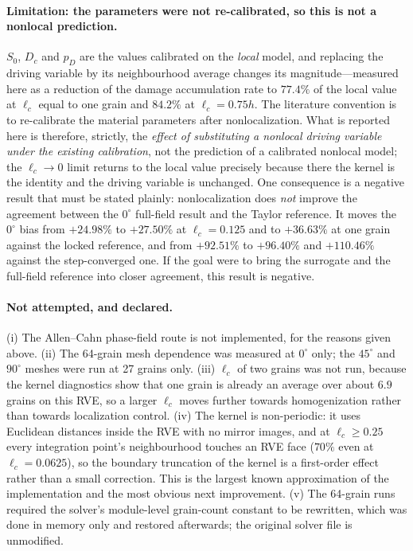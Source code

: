 \documentclass[12pt,a4paper,twocolumn]{article}
\providecommand{\ang}[1]{\ensuremath{#1^{\circ}}}
\begin{document}
\paragraph{Limitation: the parameters were not re-calibrated, so this is not a nonlocal prediction.} $S_0$,
$D_c$ and $p_D$ are the values calibrated on the \emph{local} model, and replacing the driving variable by its
neighbourhood average changes its magnitude---measured here as a reduction of the damage accumulation rate to
$77.4\%$ of the local value at $\ell_c$ equal to one grain and $84.2\%$ at $\ell_c = 0.75h$. The literature
convention is to re-calibrate the material parameters after nonlocalization. What is reported here is therefore,
strictly, the \emph{effect of substituting a nonlocal driving variable under the existing calibration}, not the
prediction of a calibrated nonlocal model; the $\ell_c \to 0$ limit returns to the local value precisely because
there the kernel is the identity and the driving variable is unchanged. One consequence is a negative result
that must be stated plainly: nonlocalization does \emph{not} improve the agreement between the $\ang{0}$
full-field result and the Taylor reference. It moves the $\ang{0}$ bias from $+24.98\%$ to $+27.50\%$ at
$\ell_c = 0.125$ and to $+36.63\%$ at one grain against the locked reference, and from $+92.51\%$ to $+96.40\%$
and $+110.46\%$ against the step-converged one. If the goal were to bring the surrogate and the full-field
reference into closer agreement, this result is negative.

\paragraph{Not attempted, and declared.} (i) The Allen--Cahn phase-field route is not implemented, for the
reasons given above. (ii) The 64-grain mesh dependence was measured at $\ang{0}$ only; the $\ang{45}$ and
$\ang{90}$ meshes were run at 27 grains only. (iii) $\ell_c$ of two grains was not run, because the kernel
diagnostics show that one grain is already an average over about $6.9$ grains on this RVE, so a larger $\ell_c$
moves further towards homogenization rather than towards localization control. (iv) The kernel is non-periodic:
it uses Euclidean distances inside the RVE with no mirror images, and at $\ell_c \ge 0.25$ every integration
point's neighbourhood touches an RVE face ($70\%$ even at $\ell_c = 0.0625$), so the boundary truncation of the
kernel is a first-order effect rather than a small correction. This is the largest known approximation of the
implementation and the most obvious next improvement. (v) The 64-grain runs required the solver's module-level
grain-count constant to be rewritten, which was done in memory only and restored afterwards; the original
solver file is unmodified.
\end{document}

